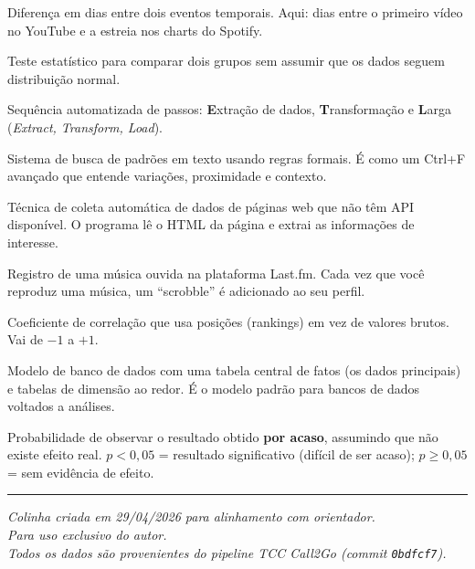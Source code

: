 \documentclass[12pt,a4paper]{article}
\newcommand{\term}[1]{\textcolor{roxo}{\textit{#1}}}
\begin{document}
\begin{description}[leftmargin=1.8em]
  \item[\term{Lag (defasagem)}] Diferença em dias entre dois eventos temporais.
        Aqui: dias entre o primeiro vídeo no YouTube e a estreia nos charts do
        Spotify.

  \item[\term{Mann-Whitney U}] Teste estatístico para comparar dois grupos sem
        assumir que os dados seguem distribuição normal.

  \item[\term{Pipeline ETL}] Sequência automatizada de passos:
        \textbf{E}xtração de dados, \textbf{T}ransformação e \textbf{L}arga
        (\textit{Extract, Transform, Load}).

  \item[\term{Regex (expressão regular)}] Sistema de busca de padrões em texto
        usando regras formais. É como um Ctrl+F avançado que entende variações,
        proximidade e contexto.

  \item[\term{Scraping}] Técnica de coleta automática de dados de páginas web
        que não têm API disponível. O programa lê o HTML da página e extrai
        as informações de interesse.

  \item[\term{Scrobble (Last.fm)}] Registro de uma música ouvida na plataforma
        Last.fm. Cada vez que você reproduz uma música, um ``scrobble'' é
        adicionado ao seu perfil.

  \item[\term{Spearman ($\rho$)}] Coeficiente de correlação que usa posições
        (rankings) em vez de valores brutos. Vai de $-1$ a $+1$.

  \item[\term{Star schema}] Modelo de banco de dados com uma tabela central de
        fatos (os dados principais) e tabelas de dimensão ao redor. É o modelo
        padrão para bancos de dados voltados a análises.

  \item[\term{Valor-p ($p$-value)}] Probabilidade de observar o resultado
        obtido \textbf{por acaso}, assumindo que não existe efeito real.
        $p < 0{,}05$ = resultado significativo (difícil de ser acaso);
        $p \geq 0{,}05$ = sem evidência de efeito.

\end{description}

\vspace{3em}
\hrule
\vspace{0.8em}
\begin{center}
\small\textcolor{cinza}{\itshape
  Colinha criada em 29/04/2026 para alinhamento com orientador.\\
  Para uso exclusivo do autor.\\[0.3em]
  Todos os dados são provenientes do pipeline TCC Call2Go (commit
  \texttt{0bdfcf7}).
}
\end{center}
\end{document}
